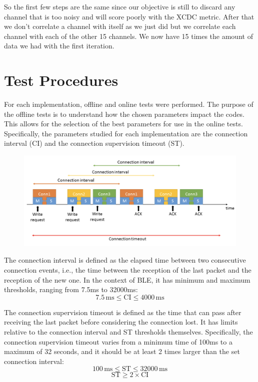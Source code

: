 \documentclass{Configuration_Files/PoliMi3i_thesis}
\begin{document}
So the first few steps are the same since our objective is still to discard any channel that is too noisy and will score poorly with the XCDC metric.
After that we don't correlate a channel with itself as we just did but we correlate each channel with each of the other 15 channels.
We now have 15 times the amount of data we had with the first iteration.

\section{Test Procedures}

For each implementation, offline and online tests were performed. The purpose of the offline tests is to understand how the chosen parameters impact the codes. This allows for the selection of the best parameters for use in the online tests. Specifically, the parameters studied for each implementation are the connection interval (CI) and the connection supervision timeout (ST).

\begin{figure}[H]
    \centering
    \includegraphics[scale=0.3]{Test_Procedure/1.png}
    \label{fig:connection_interval_timeout}
\end{figure}

The connection interval is defined as the elapsed time between two consecutive connection events, i.e., the time between the reception of the last packet and the reception of the new one. In the context of BLE, it has minimum and maximum thresholds, ranging from 7.5ms to 32000ms:
\[
7.5\,\text{ms} \leq \text{CI} \leq 4000\,\text{ms}
\]

The connection supervision timeout is defined as the time that can pass after receiving the last packet before considering the connection lost. It has limits relative to the connection interval and ST thresholds themselves. Specifically, the connection supervision timeout varies from a minimum time of 100ms to a maximum of 32 seconds, and it should be at least 2 times larger than the set connection interval:
\[
100\,\text{ms} \leq \text{ST} \leq 32000\,\text{ms}
\]
\[
\text{ST} \geq 2 \times \text{CI}
\]
\end{document}
